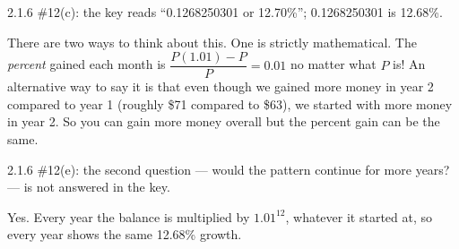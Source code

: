 \begin{sol}
 


 \begin{corr}{2.1.6 \#12(c): the key reads ``0.1268250301 or 12.70\%''; 0.1268250301 is 12.68\%.}%
\end{corr}



 


 There are two ways to think about this. One is strictly mathematical. The \emph{percent} gained each month is $\dfrac{P(1.01)-P}{P} = 0.01$ no matter what $P$ is! An alternative way to say it is that even though we gained more money in year 2 compared to year 1 (roughly \$71 compared to \$63), we started with more money in year 2. So you can gain more money overall but the percent gain can be the same.

\begin{corr}{2.1.6 \#12(e): the second question --- would the pattern continue for more years? --- is not answered in the key.}%
\end{corr}

Yes. Every year the balance is multiplied by $1.01^{12}$, whatever it started at, so every year shows the same 12.68\% growth.
\end{sol}


